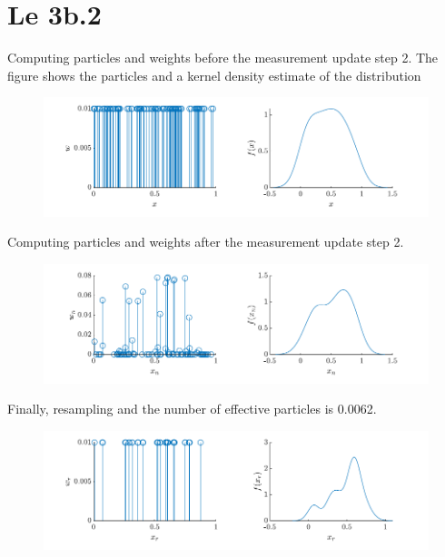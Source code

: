 \section{Le 3b.2}
Computing particles and weights before the measurement update step 2. The figure shows the particles and a kernel density estimate of the distribution
\begin{figure}[!h]
    \centering
    \includegraphics{figures/ex4_b2a.pdf}
\end{figure}

Computing particles and weights after the measurement update step 2. 
\begin{figure}[!h]
    \centering
    \includegraphics{figures/ex4_b2b.pdf}
\end{figure}

Finally, resampling and the number of effective particles is 0.0062.
\begin{figure}[!h]
    \centering
    \includegraphics{figures/ex4_b2c.pdf}
\end{figure}